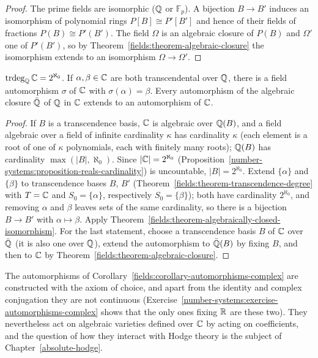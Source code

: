 \begin{proof}
The prime fields are isomorphic ($\mathbb{Q}$ or $\mathbb{F}_p$). A bijection $B \to B'$ induces an isomorphism
of polynomial rings $P[B] \cong P'[B']$ and hence of their fields of fractions
$P(B) \cong P'(B')$. The field $\Omega$ is an algebraic closure of $P(B)$ and $\Omega'$ one of $P'(B')$, so
by Theorem~\ref{fields:theorem-algebraic-closure} the isomorphism extends to an isomorphism
$\Omega \to \Omega'$.
\end{proof}

\begin{corollary}\label{fields:corollary-automorphisms-complex}
$\operatorname{trdeg}_{\mathbb{Q}} \mathbb{C} = 2^{\aleph_0}$. If $\alpha, \beta \in \mathbb{C}$ are both transcendental over $\mathbb{Q}$, there is a
field automorphism $\sigma$ of $\mathbb{C}$ with $\sigma(\alpha) = \beta$. Every automorphism of the algebraic
closure $\bar{\mathbb{Q}}$ of $\mathbb{Q}$ in $\mathbb{C}$ extends to an automorphism of $\mathbb{C}$.
\end{corollary}

\begin{proof}
If $B$ is a transcendence basis, $\mathbb{C}$ is algebraic over $\mathbb{Q}(B)$, and a field algebraic over a field
of infinite cardinality $\kappa$ has cardinality $\kappa$ (each element is a root of one of
$\kappa$ polynomials, each with finitely many roots); $\mathbb{Q}(B)$ has cardinality
$\max(|B|, \aleph_0)$. Since $|\mathbb{C}| = 2^{\aleph_0}$ (Proposition~\ref{number-systems:proposition-reals-cardinality})
is uncountable, $|B| = 2^{\aleph_0}$. Extend $\{\alpha\}$ and $\{\beta\}$ to transcendence bases $B$, $B'$
(Theorem~\ref{fields:theorem-transcendence-degree} with $T = \mathbb{C}$ and $S_0 = \{\alpha\}$, respectively
$S_0 = \{\beta\}$); both have cardinality
$2^{\aleph_0}$, and removing $\alpha$ and $\beta$ leaves sets of the same cardinality, so there is a
bijection $B \to B'$ with $\alpha \mapsto \beta$. Apply
Theorem~\ref{fields:theorem-algebraically-closed-isomorphism}. For the last statement, choose a
transcendence basis $B$ of $\mathbb{C}$ over $\bar{\mathbb{Q}}$ (it is also one over $\mathbb{Q}$), extend the automorphism
to $\bar{\mathbb{Q}}(B)$ by fixing $B$, and then to $\mathbb{C}$ by Theorem~\ref{fields:theorem-algebraic-closure}.
\end{proof}

\begin{remark}\label{fields:remark-wild-automorphisms}
The automorphisms of Corollary~\ref{fields:corollary-automorphisms-complex} are constructed with
the axiom of choice, and apart from the identity and complex conjugation they are not
continuous (Exercise~\ref{number-systems:exercise-automorphisms-complex} shows that the only ones
fixing $\mathbb{R}$ are these two). They nevertheless act on algebraic varieties defined over $\mathbb{C}$ by
acting on coefficients, and the question of how they interact with Hodge theory is the subject
of Chapter~\ref{absolute-hodge}.
\end{remark}

